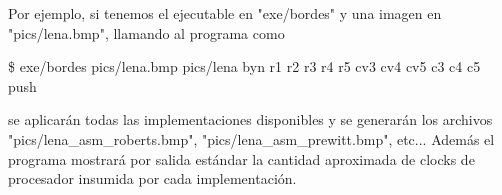 Por ejemplo, si tenemos el ejecutable en "exe/bordes" y una imagen en "pics/lena.bmp", llamando al programa como

    \$ exe/bordes pics/lena.bmp pics/lena byn r1 r2 r3 r4 r5 cv3 cv4 cv5 c3 c4 c5 push
    
se aplicarán todas las implementaciones disponibles y se generarán los archivos "pics/lena_asm_roberts.bmp", "pics/lena_asm_prewitt.bmp", etc... Además el programa mostrará por salida estándar la cantidad aproximada de clocks de procesador insumida por cada implementación.

    